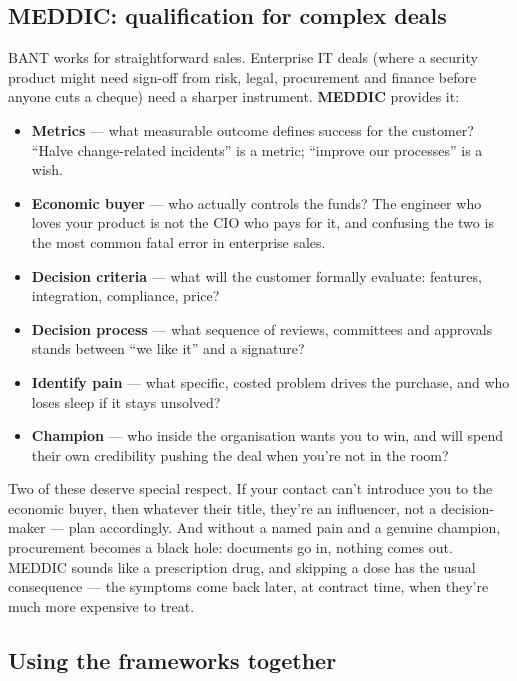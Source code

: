 \subsection{MEDDIC: qualification for complex deals}


BANT works for straightforward sales. Enterprise IT deals (where a security product might need sign-off from risk, legal, procurement and finance before anyone cuts a cheque) need a sharper instrument. \textbf{MEDDIC} provides it:


\begin{itemize}[leftmargin=*]
\item \textbf{Metrics} — what measurable outcome defines success for the customer? ``Halve change-related incidents'' is a metric; ``improve our processes'' is a wish.
\item \textbf{Economic buyer} — who actually controls the funds? The engineer who loves your product is not the CIO who pays for it, and confusing the two is the most common fatal error in enterprise sales.
\item \textbf{Decision criteria} — what will the customer formally evaluate: features, integration, compliance, price?
\item \textbf{Decision process} — what sequence of reviews, committees and approvals stands between ``we like it'' and a signature?
\item \textbf{Identify pain} — what specific, costed problem drives the purchase, and who loses sleep if it stays unsolved?
\item \textbf{Champion} — who inside the organisation wants you to win, and will spend their own credibility pushing the deal when you're not in the room?
\end{itemize}

Two of these deserve special respect. If your contact can't introduce you to the economic buyer, then whatever their title, they're an influencer, not a decision-maker — plan accordingly. And without a named pain and a genuine champion, procurement becomes a black hole: documents go in, nothing comes out. MEDDIC sounds like a prescription drug, and skipping a dose has the usual consequence — the symptoms come back later, at contract time, when they're much more expensive to treat.



\subsection{Using the frameworks together}


